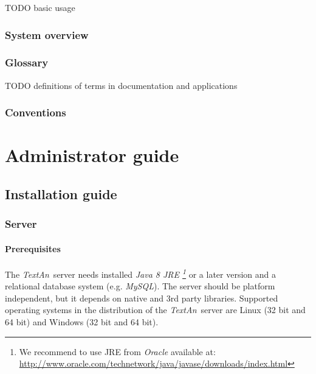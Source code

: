 \documentclass[12pt,a4paper]{report}
\newcommand{\textan}{\emph{TextAn}}
\begin{document}
TODO basic usage

\subsection{System overview}


\subsection{Glossary}

TODO definitions of terms in documentation and applications

\subsection{Conventions} %



\chapter{Administrator guide}


\section{Installation guide}

\subsection{Server}


\subsubsection{Prerequisites}
\label{sssec:SerInstPre}

The \textan\ server needs installed \emph{Java 8 JRE \footnote{We recommend to use JRE from \emph{Oracle} available at: \url{http://www.oracle.com/technetwork/java/javase/downloads/index.html}}} or a later version and a relational database system (e.g. \emph{MySQL}). The server should be platform independent, but it depends on native and 3rd party libraries. Supported operating systems in the distribution of the \textan\ server are Linux (32 bit and 64 bit) and Windows (32 bit and 64 bit).
\end{document}
